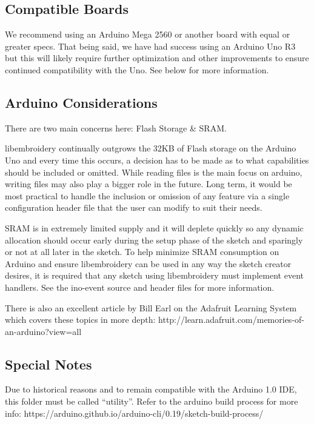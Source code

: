 \documentclass[onesize, a4paper]{refart}
\begin{document}
\subsection{Compatible Boards}

We recommend using an Arduino Mega 2560 or another board with equal or
greater specs. That being said, we have had success using an Arduino Uno
R3 but this will likely require further optimization and other
improvements to ensure continued compatibility with the Uno. See below
for more information.

\subsection{Arduino Considerations}

There are two main concerns here: Flash Storage \& SRAM.

libembroidery continually outgrows the 32KB of Flash storage on the
Arduino Uno and every time this occurs, a decision has to be made as to
what capabilities should be included or omitted. While reading files is
the main focus on arduino, writing files may also play a bigger role in
the future. Long term, it would be most practical to handle the
inclusion or omission of any feature via a single configuration header
file that the user can modify to suit their needs.

SRAM is in extremely limited supply and it will deplete quickly so any
dynamic allocation should occur early during the setup phase of the
sketch and sparingly or not at all later in the sketch. To help minimize
SRAM consumption on Arduino and ensure libembroidery can be used in any
way the sketch creator desires, it is required that any sketch using
libembroidery must implement event handlers. See the ino-event source
and header files for more information.

There is also an excellent article by Bill Earl on the Adafruit Learning
System which covers these topics in more depth:
http://learn.adafruit.com/memories-of-an-arduino?view=all

\subsection{Special Notes}

Due to historical reasons and to remain compatible with the Arduino 1.0
IDE, this folder must be called ``utility''. Refer to the arduino build
process for more info:
https://arduino.github.io/arduino-cli/0.19/sketch-build-process/
\end{document}
